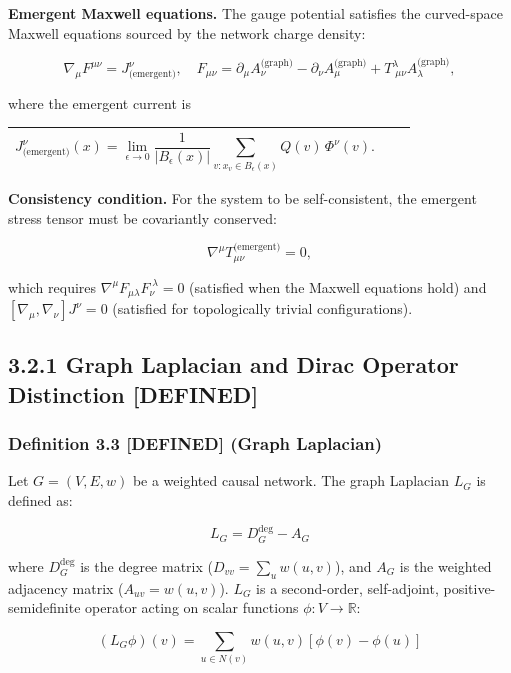 \documentclass[11pt,a4paper]{article}
\theoremstyle{plain}
\theoremstyle{definition}
\begin{document}
\textbf{Emergent Maxwell equations.} The gauge potential satisfies the curved-space Maxwell equations sourced by the network charge density:

$$\nabla_\mu F^{\mu\nu} = J^{\nu}_{\text{(emergent)}}, \quad F_{\mu\nu} = \partial_\mu A_\nu^{\text{(graph)}} - \partial_\nu A_\mu^{\text{(graph)}} + T^{\lambda}_{\;\mu\nu} A_\lambda^{\text{(graph)}},$$

where the emergent current is

\begin{table}[h]
\centering
\begin{tabular}{|c|c|c|}
\hline
$$J^{\nu}_{\text{(emergent)}}(x) = \lim_{\epsilon \to 0} \frac{1}{|B_\epsilon(x)|} \sum_{v: x_v \in B_\epsilon(x)} Q(v) \, \Phi^\nu(v).$$ \\ \hline
\end{tabular}
\end{table}

\textbf{Consistency condition.} For the system to be self-consistent, the emergent stress tensor must be covariantly conserved:

$$\nabla^\mu T^{\text{(emergent)}}_{\mu\nu} = 0,$$

which requires $\nabla^\mu F_{\mu\lambda} F_{\nu}^{\;\lambda} = 0$ (satisfied when the Maxwell equations hold) and $[\nabla_\mu, \nabla_\nu] J^{\nu} = 0$ (satisfied for topologically trivial configurations).

\subsection{3.2.1 Graph Laplacian and Dirac Operator Distinction \textbf{[DEFINED]}}

\subsubsection{Definition 3.3 \textbf{[DEFINED]} (Graph Laplacian)}

Let $G = (V, E, w)$ be a weighted causal network. The graph Laplacian $L_G$ is defined as:

$$L_G = D_G^{\text{deg}} - A_G$$

where $D_G^{\text{deg}}$ is the degree matrix ($D_{vv} = \sum_u w(u,v)$), and $A_G$ is the weighted adjacency matrix ($A_{uv} = w(u,v)$). $L_G$ is a second-order, self-adjoint, positive-semidefinite operator acting on scalar functions $\phi: V \to \mathbb{R}$:

$$(L_G \phi)(v) = \sum_{u \in N(v)} w(u,v) [\phi(v) - \phi(u)]$$
\end{document}
